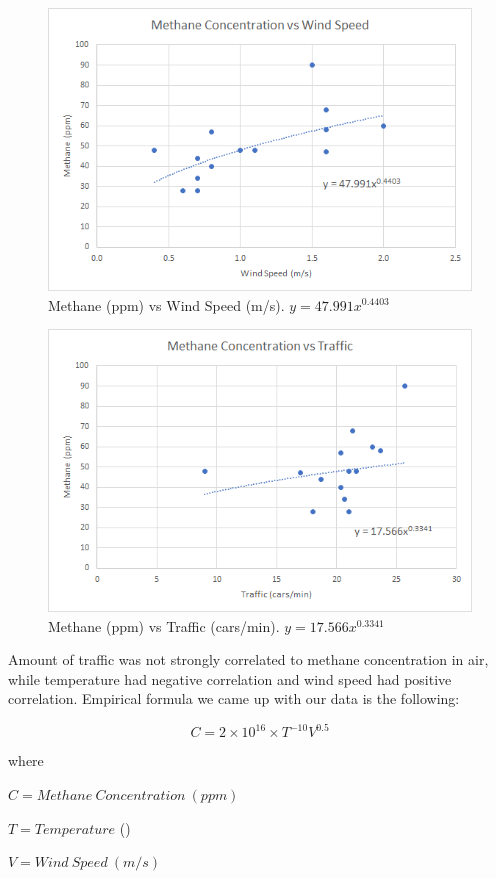 \documentclass{article}
\begin{document}
\begin{figure}[h!]
	\centering
	\includegraphics[width=0.7\linewidth]{part1_wind}
	\caption[Methane vs Wind Speed]{Methane (ppm) vs Wind Speed (m/s). $y = 47.991x^{0.4403}$}
	\label{fig:part1wind}
\end{figure}

\begin{figure}[h!]
	\centering
	\includegraphics[width=0.7\linewidth]{part1_traffic}
	\caption[Methane vs Traffic]{Methane (ppm) vs Traffic (cars/min). $y = 17.566x^{0.3341}$}
	\label{fig:part1traffic}
\end{figure}

Amount of traffic was not strongly correlated to methane concentration in air, while temperature had negative correlation and wind speed had positive correlation. Empirical formula we came up with our data is the following:

\begin{equation} \label{eq:empirical}
C = 2 \times 10^{16} \times T^{-10} V^{0.5}
\end{equation}

where

$C = Methane\ Concentration\ (ppm)$

$T = Temperature$ (\textcelsius)

$V = Wind\ Speed\ (m/s)$
\end{document}
